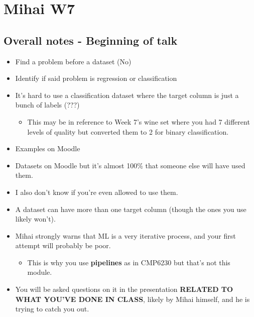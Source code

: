 \documentclass[12pt]{report}
\begin{document}
\section{Mihai W7}
\subsection{Overall notes - Beginning of talk}
\begin{itemize}
    \item Find a problem before a dataset (No)
    \item Identify if said problem is regression or classification
    \item It's hard to use a classification dataset where the target column is just a bunch of labels (???)
    \begin{itemize}
        \item This may be in reference to Week 7's wine set where you had 7 different levels of quality but converted them to 2 for binary classification.
    \end{itemize}
    \item Examples on Moodle
    \item Datasets on Moodle but it's almost 100\% that someone else will have used them.
    \item I also don't know if you're even allowed to use them.
    \item A dataset can have more than one target column (though the ones you use likely won't).
    \item Mihai strongly warns that ML is a very iterative process, and your first attempt will probably be poor. \begin{itemize}
        \item This is why you use \textbf{pipelines} as in CMP6230 but that's not this module.
    \end{itemize}
    \item You will be asked questions on it in the presentation \textbf{RELATED TO WHAT YOU'VE DONE IN CLASS}, likely
    by Mihai himself, and he is trying to catch you out.
\end{itemize}
\end{document}
